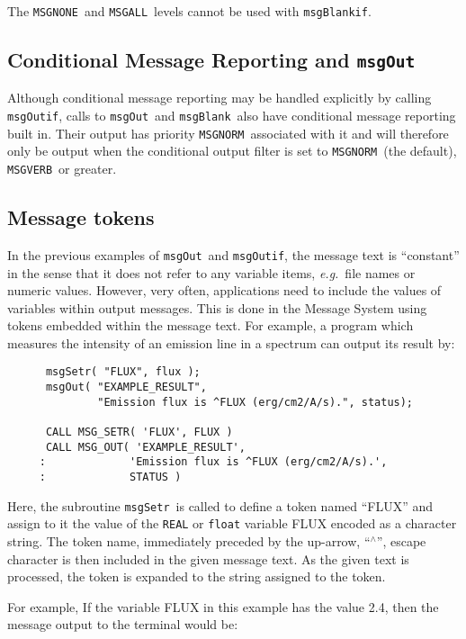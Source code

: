 \documentclass[twoside,11pt]{article}
\newcommand{\xlabel}[1]{}
\renewcommand{\_}{\texttt{\symbol{95}}}
\newcommand{\func}[1]{\texttt{#1}}
\newcommand{\const}[1]{\texttt{#1}}
\newcommand{\msgnone}{\const{MSG\_\_NONE}}
\newcommand{\msgall}{\const{MSG\_\_ALL}}
\newcommand{\msgnorm}{\const{MSG\_\_NORM}}
\newcommand{\msgverb}{\const{MSG\_\_VERB}}
\newcommand{\msgblank}{\func{msgBlank}}
\newcommand{\msgblankif}{\func{msgBlankif}}
\newcommand{\msgout}{\func{msgOut}}
\newcommand{\msgoutif}{\func{msgOutif}}
\newcommand{\msgsetr}{\func{msgSetr}}
\begin{document}
The \msgnone\ and \msgall\ levels cannot be used with \msgblankif.

\subsection{\xlabel{conditional_message_reporting_and_msg_out}Conditional Message Reporting and \msgout}

Although conditional message reporting may be handled explicitly by calling
\msgoutif, calls to \msgout\ and \msgblank\ also have conditional message
reporting built in.
Their output has priority \msgnorm\ associated with it and will therefore
only be output when the conditional output filter is set to \msgnorm\ (the
default), \msgverb\ or greater.

\subsection{\xlabel{message_tokens}Message tokens}
In the previous examples of \msgout\ and \msgoutif, the message text is
``constant'' in the sense that it does not refer to any variable items,
\textit{e.g.}\ file names or numeric values.
However, very often, applications need to include the values of
variables within output messages.
This is done in the Message System using tokens embedded within the message
text.
For example, a program which measures the intensity of an emission line in
a spectrum can output its result by:

\begin {small}
\begin{verbatim}
      msgSetr( "FLUX", flux );
      msgOut( "EXAMPLE_RESULT",
              "Emission flux is ^FLUX (erg/cm2/A/s).", status);

      CALL MSG_SETR( 'FLUX', FLUX )
      CALL MSG_OUT( 'EXAMPLE_RESULT',
     :             'Emission flux is ^FLUX (erg/cm2/A/s).',
     :             STATUS )
\end{verbatim}
\end {small}

Here, the subroutine \msgsetr\ is called to define a token named ``FLUX''
and assign to it the value of the \texttt{REAL} or \texttt{float} variable FLUX encoded as a character
string.
The token name, immediately preceded by the up-arrow, ``$^\wedge$'', escape
character is then included in the given message text.
As the given text is processed, the token is expanded to the string assigned to
the token.

For example, If the variable FLUX in this example has the value 2.4, then
the message output to the terminal would be:
\end{document}
